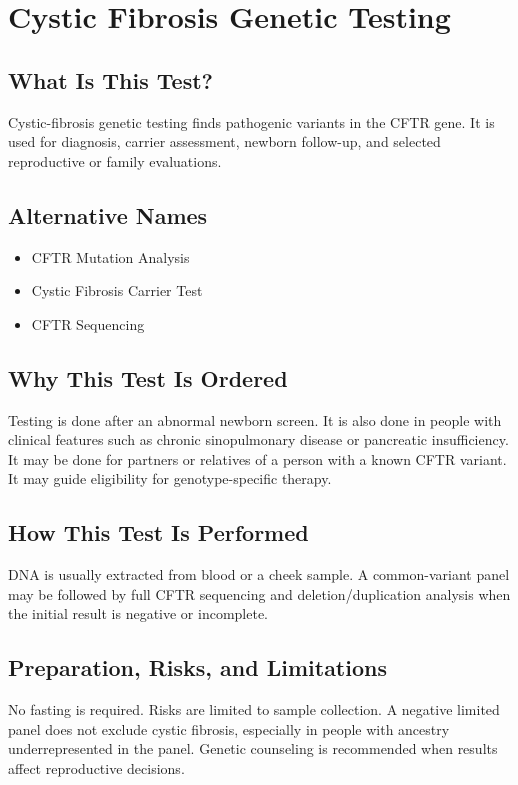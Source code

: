 \chapter{Cystic Fibrosis Genetic Testing}

\section*{What Is This Test?}
Cystic-fibrosis genetic testing finds pathogenic variants in the CFTR gene. It is used for diagnosis, carrier assessment, newborn follow-up, and selected reproductive or family evaluations.

\section*{Alternative Names}
\begin{itemize}
  \item CFTR Mutation Analysis
  \item Cystic Fibrosis Carrier Test
  \item CFTR Sequencing
\end{itemize}
\section*{Why This Test Is Ordered}
Testing is done after an abnormal newborn screen. It is also done in people with clinical features such as chronic sinopulmonary disease or pancreatic insufficiency. It may be done for partners or relatives of a person with a known CFTR variant. It may guide eligibility for genotype-specific therapy.

\section*{How This Test Is Performed}
DNA is usually extracted from blood or a cheek sample. A common-variant panel may be followed by full CFTR sequencing and deletion/duplication analysis when the initial result is negative or incomplete.

\section*{Preparation, Risks, and Limitations}
No fasting is required. Risks are limited to sample collection. A negative limited panel does not exclude cystic fibrosis, especially in people with ancestry underrepresented in the panel. Genetic counseling is recommended when results affect reproductive decisions.

